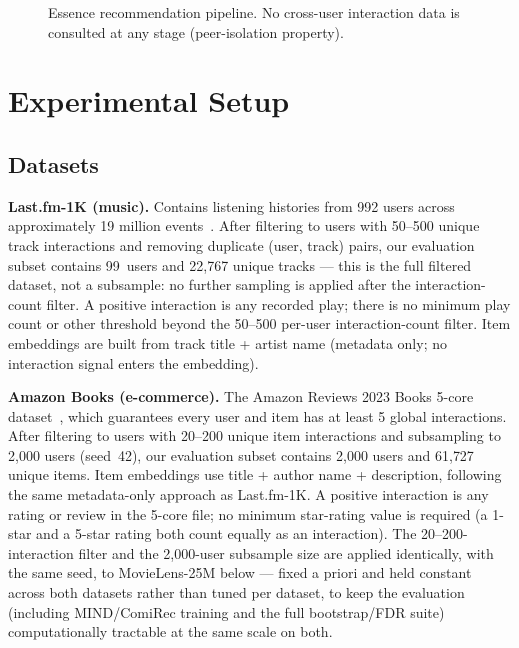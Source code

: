 \documentclass[11pt,a4paper]{article}
\begin{document}
\begin{figure}[htbp]
\caption{Essence recommendation pipeline. No cross-user interaction data is consulted at
any stage (peer-isolation property).}
\label{fig:pipeline}
\end{figure}

\section{Experimental Setup}
\label{sec:setup}

\subsection{Datasets}

\textbf{Last.fm-1K (music).} Contains listening histories from 992 users
across approximately 19 million events~\cite{celma2010}. After filtering to
users with 50--500 unique track interactions and removing duplicate
(user, track) pairs, our evaluation subset contains 99~users and 22{,}767
unique tracks --- this is the full filtered dataset, not a subsample: no
further sampling is applied after the interaction-count filter. A positive
interaction is any recorded play; there is no minimum play count or other
threshold beyond the 50--500 per-user interaction-count filter. Item
embeddings are built from track title + artist name (metadata only; no
interaction signal enters the embedding).

\textbf{Amazon Books (e-commerce).} The Amazon Reviews 2023 Books 5-core
dataset~\cite{hou2024}, which guarantees every user and item has at least
5 global interactions. After filtering to users with 20--200 unique item
interactions and subsampling to 2{,}000 users (seed~42), our evaluation
subset contains 2{,}000 users and 61{,}727 unique items. Item embeddings use
title + author name + description, following the same metadata-only
approach as Last.fm-1K. A positive interaction is any rating or review in
the 5-core file; no minimum star-rating value is required (a 1-star and a
5-star rating both count equally as an interaction). The 20--200-interaction filter and the 2{,}000-user
subsample size are applied identically, with the same seed, to MovieLens-25M
below --- fixed a priori and held constant across both datasets rather than
tuned per dataset, to keep the evaluation (including MIND/ComiRec training
and the full bootstrap/FDR suite) computationally tractable at the same
scale on both.
\end{document}
